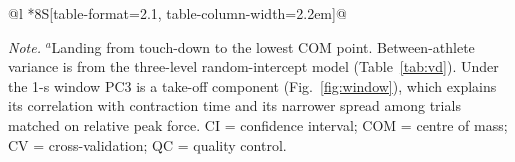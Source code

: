 \begin{table}[!htbp]
\begin{threeparttable}
\begin{tabular}{@{}l *{8}{S[table-format=2.1, table-column-width=2.2em]}@{}}
\bottomrule
\end{tabular}
\begin{tablenotes}[flushleft]\footnotesize
\item \textit{Note.} $^{a}$Landing from touch-down to the lowest COM point. Between-athlete variance is from the three-level random-intercept model (Table~\ref{tab:vd}). Under the 1-s window PC3 is a take-off component (Fig.~\ref{fig:window}), which explains its correlation with contraction time and its narrower spread among trials matched on relative peak force. CI = confidence interval; COM = centre of mass; CV = cross-validation; QC = quality control.
\end{tablenotes}
\end{threeparttable}
\end{table}
